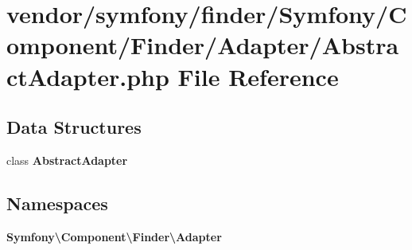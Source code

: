 \section{vendor/symfony/finder/\+Symfony/\+Component/\+Finder/\+Adapter/\+Abstract\+Adapter.php File Reference}
\label{symfony_2finder_2_symfony_2_component_2_finder_2_adapter_2_abstract_adapter_8php}
\subsection*{Data Structures}
\begin{DoxyCompactItemize}
\item 
class {\bf Abstract\+Adapter}
\end{DoxyCompactItemize}
\subsection*{Namespaces}
\begin{DoxyCompactItemize}
\item 
 {\bf Symfony\textbackslash{}\+Component\textbackslash{}\+Finder\textbackslash{}\+Adapter}
\end{DoxyCompactItemize}
